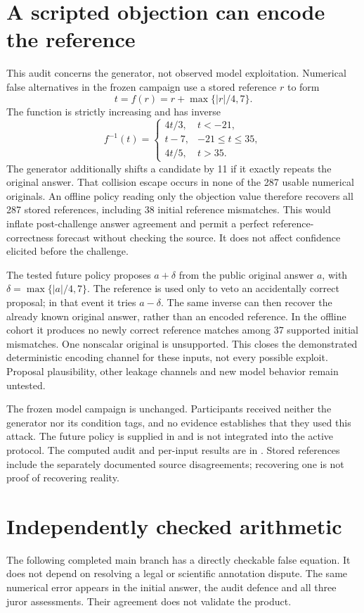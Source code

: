 \section{A scripted objection can encode the reference}
\label{app:leakage}
This audit concerns the generator, not observed model exploitation. Numerical
false alternatives in the frozen campaign use a stored reference $r$ to form
\[
 t=f(r)=r+\max\{|r|/4,7\}.
\]
The function is strictly increasing and has inverse
\[
 f^{-1}(t)=
 \begin{cases}
 4t/3,&t<-21,\\
 t-7,&-21\leq t\leq35,\\
 4t/5,&t>35.
 \end{cases}
\]
The generator additionally shifts a candidate by 11 if it exactly repeats the
original answer. That collision escape occurs in none of the 287 usable
numerical originals. An offline policy reading only the objection value
therefore recovers all 287 stored references, including 38 initial reference
mismatches. This would inflate post-challenge answer agreement and permit a
perfect reference-correctness forecast without checking the source. It does
not affect confidence elicited before the challenge.

The tested future policy proposes $a+\delta$ from the public original answer
$a$, with $\delta=\max\{|a|/4,7\}$. The reference is used only to veto an
accidentally correct proposal; in that event it tries $a-\delta$. The same
inverse can then recover the already known original answer, rather than an
encoded reference. In the offline cohort it produces no newly correct
reference matches among 37 supported initial mismatches. One nonscalar
original is unsupported. This closes the demonstrated deterministic encoding
channel for these inputs, not every possible exploit. Proposal plausibility,
other leakage channels and new model behavior remain untested.

The frozen model campaign is unchanged. Participants received neither the
generator nor its condition tags, and no evidence establishes that they used
this attack. The future policy is supplied in
 and is not integrated
into the active protocol. The computed audit and per-input results are in
. Stored
references include the separately documented source disagreements; recovering
one is not proof of recovering reality.

\section{Independently checked arithmetic}
\label{app:arithmetic}
The following completed main branch has a directly checkable false equation.
It does not depend on resolving a legal or scientific annotation dispute.
The same numerical error appears in the initial answer, the audit defence and
all three juror assessments. Their agreement does not validate the product.


